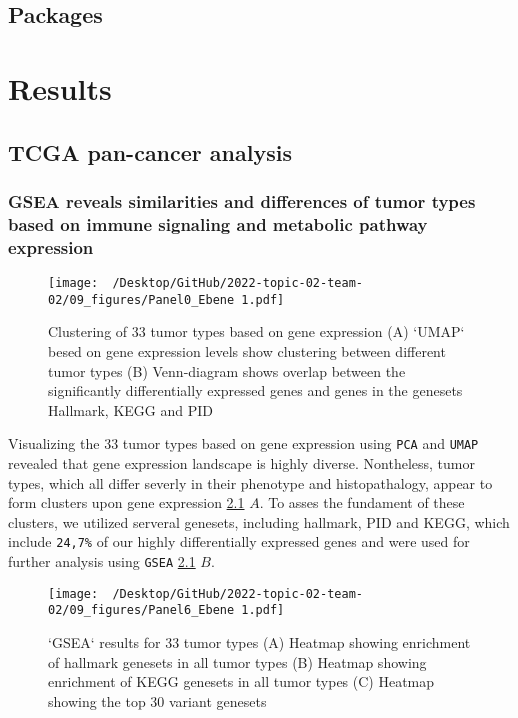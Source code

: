\documentclass[
  parskip,
  oneside]{scrreprt}
\begin{document}
\hypertarget{packages}{%
\section{Packages}\label{packages}}

\hypertarget{results}{%
\chapter{Results}\label{results}}

\hypertarget{tcga-pan-cancer-analysis-1}{%
\section{TCGA pan-cancer analysis}\label{tcga-pan-cancer-analysis-1}}

\hypertarget{gsea-reveals-similarities-and-differences-of-tumor-types-based-on-immune-signaling-and-metabolic-pathway-expression}{%
\subsection{GSEA reveals similarities and differences of tumor types
based on immune signaling and metabolic pathway
expression}\label{gsea-reveals-similarities-and-differences-of-tumor-types-based-on-immune-signaling-and-metabolic-pathway-expression}}

\begin{figure}[h]
  \texttt{[image: ~/Desktop/GitHub/2022-topic-02-team-02/09\_figures/Panel0\_Ebene 1.pdf]}
  \caption{Clustering of 33 tumor types based on gene expression (A) `UMAP` besed on gene expression levels show clustering between different tumor types (B) Venn-diagram shows overlap between the significantly differentially expressed genes and genes in the genesets Hallmark, KEGG and PID}
  \label{`UMAP`}
\end{figure}

Visualizing the 33 tumor types based on gene expression using
\texttt{PCA} and \texttt{UMAP} revealed that gene expression landscape
is highly diverse. Nontheless, tumor types, which all differ severly in
their phenotype and histopathalogy, appear to form clusters upon gene
expression \cref{`UMAP`} \(A\). To asses the fundament of these
clusters, we utilized serveral genesets, including hallmark, PID and
KEGG, which include \texttt{24,7\%} of our highly differentially
expressed genes and were used for further analysis using \texttt{GSEA}
\cref{`UMAP`} \(B\).

\begin{figure}[h]
  \texttt{[image: ~/Desktop/GitHub/2022-topic-02-team-02/09\_figures/Panel6\_Ebene 1.pdf]}
  \caption{`GSEA` results for 33 tumor types (A) Heatmap showing enrichment of hallmark genesets in all tumor types (B) Heatmap showing enrichment of KEGG genesets in all tumor types (C) Heatmap showing the top 30 variant genesets}
  \label{hm}
\end{figure}
\end{document}
